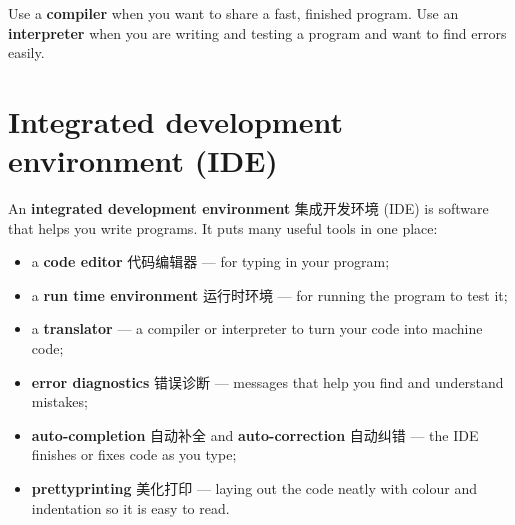 \documentclass[11pt]{article}
\begin{document}
Use a \textbf{compiler} when you want to share a fast, finished program. Use an \textbf{interpreter} when you are writing and testing a program and want to find errors easily.

\section*{Integrated development environment (IDE)}

An \textbf{integrated development environment} 集成开发环境 (IDE) is software that helps you write programs. It puts many useful tools in one place:

\begin{itemize}
\item a \textbf{code editor} 代码编辑器 — for typing in your program;

\item a \textbf{run time environment} 运行时环境 — for running the program to test it;

\item a \textbf{translator} — a compiler or interpreter to turn your code into machine code;

\item \textbf{error diagnostics} 错误诊断 — messages that help you find and understand mistakes;

\item \textbf{auto-completion} 自动补全 and \textbf{auto-correction} 自动纠错 — the IDE finishes or fixes code as you type;

\item \textbf{prettyprinting} 美化打印 — laying out the code neatly with colour and indentation so it is easy to read.

\end{itemize}
\end{document}
